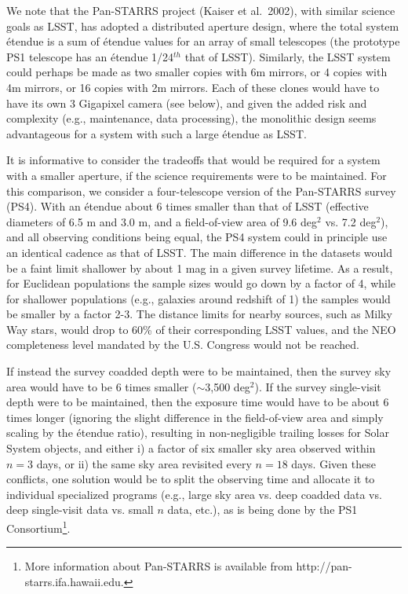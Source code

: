 \documentclass{emulateapj}
\begin{document}
We note that the Pan-STARRS project (Kaiser et al.~2002), with similar science
goals as LSST, has adopted a distributed aperture design, where the total
system \'etendue is 
a sum of \'etendue values for an array of small telescopes (the prototype
PS1 telescope has an \'etendue 1/24$^{th}$ that of LSST). 
Similarly, the LSST system could perhaps be made as two smaller copies with 
6m mirrors, or 4 copies with 4m mirrors, or 16 copies with 2m mirrors. Each 
of these clones would have to have its own 3 Gigapixel camera (see below), and 
given the added risk and complexity (e.g., maintenance, data processing), the monolithic 
design seems advantageous for a system with such a large \'etendue as LSST. 

It is informative to consider the tradeoffs that would be required 
for a system with a smaller aperture, if the science requirements were
to be maintained. For this comparison, we consider a four-telescope version of
the Pan-STARRS survey (PS4). With an \'etendue about 6 times smaller 
than that of LSST (effective diameters of 6.5 m and 3.0 m, and a field-of-view area 
of 9.6 deg$^2$ vs. 7.2 deg$^2$), and all observing conditions being equal,
the PS4 system could in principle use an identical cadence as that of LSST. The
main difference in the datasets would be a faint limit shallower by about 
1 mag in a given survey lifetime. As a result, for Euclidean populations the 
sample sizes would go down by a factor of 4, while for shallower populations (e.g.,
galaxies around redshift of 1) the samples would be smaller by a factor 2-3. 
The distance limits for nearby sources, such as Milky Way stars, would drop to
60\% of their corresponding LSST values, and the NEO completeness level mandated by
the U.S. Congress would not be reached.  

If instead the survey coadded depth were to be maintained, then the survey sky 
area would have to be 6 times smaller ($\sim$3,500 deg$^2$). If the
survey single-visit depth were to be maintained, then the exposure
time would have to be about 6 times longer (ignoring the slight difference
in the field-of-view area and simply scaling by the \'etendue ratio), 
resulting in non-negligible trailing losses for Solar System objects, 
and either 
i) a factor of six smaller sky area observed within $n=3$ days, or 
ii) the same sky area revisited every $n=18$ days. 
Given these conflicts, one solution would be to split the observing time and 
allocate it to individual specialized programs (e.g., large sky area vs. 
deep coadded data vs. deep single-visit data vs. small $n$ data, etc.), 
as is being done by the PS1 Consortium\footnote{More information about 
Pan-STARRS is available from http://pan-starrs.ifa.hawaii.edu.}. 
\end{document}
